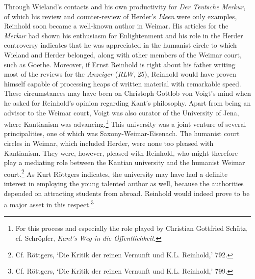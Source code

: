 Through Wieland's contacts and his own productivity for \textit{Der Teutsche Merkur}, of which his review and counter{-}review of Herder's \textit{Ideen} were only examples, Reinhold soon became a well{-}known author in Weimar. His articles for the \textit{Merkur} had shown his enthusiasm for Enlightenment and his role in the Herder controversy indicates that he was appreciated in the humanist circle to which Wieland and Herder belonged, along with other members of the Weimar court, such as Goethe. Moreover, if Ernst Reinhold is right about his father writing most of the reviews for the \textit{Anzeiger }(\textit{RLW}, 25), Reinhold would have proven himself capable of processing heaps of written material with remarkable speed. These circumstances may have been on Christoph Gottlob von Voigt's mind when he asked for Reinhold's opinion regarding Kant's philosophy. Apart from being an advisor to the Weimar court, Voigt was also curator of the University of Jena, where Kantianism was advancing.\footnote{ For this process and especially the role played by Christian Gottfried Sch\"{u}tz, cf. Schr\"{o}pfer, \textit{Kant's Weg in die \"{O}ffentlichkeit}. } This university was a joint venture of several principalities, one of which was Saxony{-}Weimar{-}Eisenach. The humanist court circles in Weimar, which included Herder, were none too pleased with Kantianism. They were, however, pleased with Reinhold, who might therefore play a mediating role between the Kantian university and the humanist Weimar court.\footnote{ Cf. R\"{o}ttgers, `Die Kritik der reinen Vernunft und K.L. Reinhold,' 792.} As Kurt R\"{o}ttgers indicates, the university may have had a definite interest in employing the young talented author as well, because the authorities depended on attracting students from abroad. Reinhold would indeed prove to be a major asset in this respect.\footnote{ Cf. R\"{o}ttgers, `Die Kritik der reinen Vernunft und K.L. Reinhold,' 799.}

